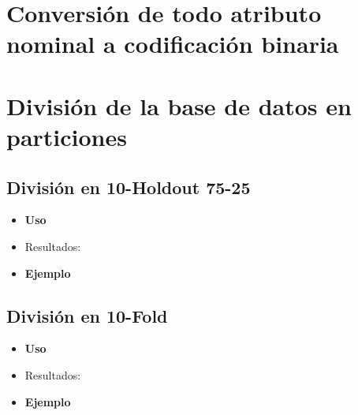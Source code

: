 \newpage
\section{Conversión de todo atributo nominal a codificación binaria}


\newpage
\section{División de la base de datos en particiones}

	\subsection{División en 10-Holdout 75-25}
	\begin{itemize}
		\item \textbf{Uso}
		\item Resultados:
		\item \textbf{Ejemplo}
	\end{itemize}


	\subsection{División en 10-Fold}
	\begin{itemize}
		\item \textbf{Uso}
		\item Resultados:
		\item \textbf{Ejemplo}
	\end{itemize}

